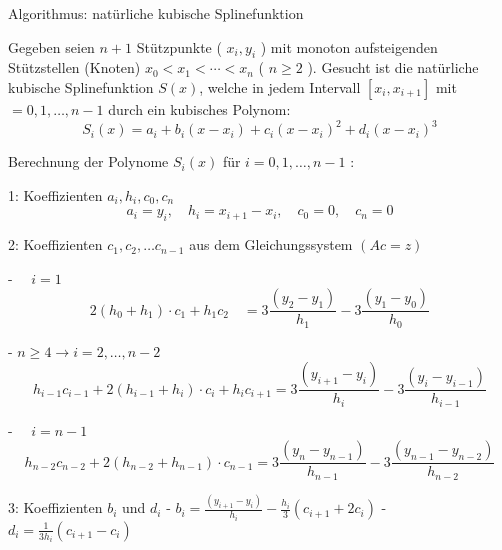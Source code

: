 \begin{KR}{Algorithmus: natürliche kubische Splinefunktion}

    Gegeben seien $n+1$ Stützpunkte ( $x_i, y_i$ ) mit monoton aufsteigenden Stützstellen (Knoten) $x_0<x_1<\cdots<x_n$ ( $n \geq 2$ ). Gesucht ist die natürliche kubische Splinefunktion $S(x)$, welche in jedem Intervall $\left[x_i, x_{i+1}\right]$ mit $=0,1, \ldots, n-1$ durch ein kubisches Polynom:
    $$
    S_i(x)=a_i+b_i\left(x-x_i\right)+c_i\left(x-x_i\right)^2+d_i\left(x-x_i\right)^3
    $$
    
    \tcblower

    Berechnung der Polynome $S_i(x)$ für $i=0,1, \ldots, n-1$ :

    1: Koeffizienten $a_i, h_i, c_0, c_n$
    $$
    a_i=y_i, \quad h_i=x_{i+1}-x_i, \quad c_0=0, \quad c_n=0
    $$


    2: Koeffizienten $c_1, c_2, \ldots c_{n-1}$ aus dem Gleichungssystem $(A c=z)$

    - $\quad i=1$
    $$
    2\left(h_0+h_1\right) \cdot c_1+h_1 c_2 \quad=3 \frac{\left(y_2-y_1\right)}{h_1}-3 \frac{\left(y_1-y_0\right)}{h_0}
    $$

    - $n \geq 4 \rightarrow i=2, \ldots, n-2$
    $$
    h_{i-1} c_{i-1}+2\left(h_{i-1}+h_i\right) \cdot c_i+h_i c_{i+1}=3 \frac{\left(y_{i+1}-y_i\right)}{h_i}-3 \frac{\left(y_i-y_{i-1}\right)}{h_{i-1}}
    $$

    - $\quad i=n-1$
    $$
    h_{n-2} c_{n-2}+2\left(h_{n-2}+h_{n-1}\right) \cdot c_{n-1}=3 \frac{\left(y_n-y_{n-1}\right)}{h_{n-1}}-3 \frac{\left(y_{n-1}-y_{n-2}\right)}{h_{n-2}}
    $$

    3: Koeffizienten $b_i$ und $d_i$
    - $b_i=\frac{\left(y_{i+1}-y_i\right)}{h_i}-\frac{h_i}{3}\left(c_{i+1}+2 c_i\right)$
    - $d_i=\frac{1}{3 h_i}\left(c_{i+1}-c_i\right)$
\end{KR}

